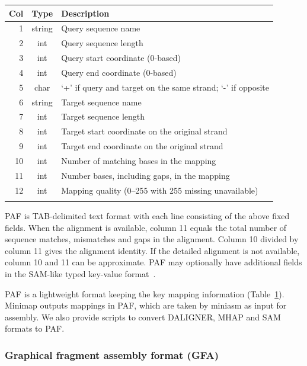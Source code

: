\documentclass{bioinfo}
\begin{document}
\begin{methods}
\begin{table}[tb]
{\footnotesize\label{tab:paf}
\begin{tabular}{rcl}
\toprule
Col & Type & Description \\
\midrule
1 & string & Query sequence name \\
2 & int    & Query sequence length \\
3 & int    & Query start coordinate (0-based) \\
4 & int    & Query end coordinate (0-based) \\
5 & char   & `+' if query and target on the same strand; `-' if opposite \\
6 & string & Target sequence name \\
7 & int    & Target sequence length \\
8 & int    & Target start coordinate on the original strand \\
9 & int    & Target end coordinate on the original strand \\
10& int    & Number of matching bases in the mapping \\
11& int    & Number bases, including gaps, in the mapping \\
12& int    & Mapping quality (0--255 with 255 missing unavailable) \\
\botrule
\end{tabular}
}{PAF is TAB-delimited text format with each line consisting of the above fixed
fields. When the alignment is available, column 11 equals the total number of
sequence matches, mismatches and gaps in the alignment. Column 10 divided by
column 11 gives the alignment identity. If the detailed alignment is not
available, column 10 and 11 can be approximate. PAF may optionally have
additional fields in the SAM-like typed key-value format~\citep{Li:2009ys}.}
\end{table}

PAF is a lightweight format keeping the key mapping information (Table~\ref{tab:paf}).
Minimap outputs mappings in PAF, which are taken by miniasm as input for
assembly. We also provide scripts to convert DALIGNER, MHAP and SAM formats to
PAF.

\subsubsection{Graphical fragment assembly format (GFA)}


\end{methods}
\end{document}
